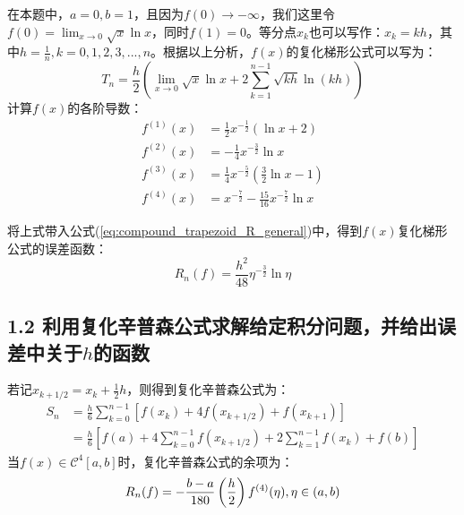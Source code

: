 在本题中，$a=0,b=1$，且因为$f(0) \rightarrow -\infty$，我们这里令$f(0) = \lim_{x \rightarrow 0} \sqrt{x} \ln x$，同时$f(1) = 0$。等分点$x_k$也可以写作：$x_k = kh$，其中$h = \frac{1}{n},k=0,1,2,3,...,n$。根据以上分析，$f(x)$的复化梯形公式可以写为：
\begin{equation}
    T_n = \frac{h}{2} \left(\lim_{x\rightarrow 0} \sqrt{x} \ln x + 2 \sum_{k=1}^{n-1} \sqrt{kh} \ln(kh)\right)
    \label{eq:compound_trapezoid_f}
\end{equation}
计算$f(x)$的各阶导数：
\begin{equation}
    \begin{aligned}
        f^{(1)}(x) & = \frac{1}{2} x^{-\frac{1}{2}} (\ln x + 2) \\
        f^{(2)}(x) & = -\frac{1}{4} x^{-\frac{3}{2}} \ln x \\
        f^{(3)}(x) & = \frac{1}{4} x^{-\frac{5}{2}} (\frac{3}{2} \ln x -1) \\
        f^{(4)}(x) & = x^{-\frac{7}{2}} - \frac{15}{16} x^{-\frac{7}{2}} \ln x
    \end{aligned}
    \label{eq:f_diff}
\end{equation}

将上式带入公式(\ref{eq:compound_trapezoid_R_general})中，得到$f(x)$复化梯形公式的误差函数：
\begin{equation}
    R_n(f) = \frac{h^2}{48} \eta^{-\frac{3}{2}} \ln \eta
    \label{eq:compound_trapezoid_R_f}
\end{equation}

\subsection*{1.2 利用复化辛普森公式求解给定积分问题，并给出误差中关于$h$的函数}

若记$x_{k+1/2} = x_k + \frac{1}{2}h$，则得到复化辛普森公式为：
\begin{equation}
    \begin{aligned}
        S_n & = \frac{h}{6} \sum_{k=0}^{n-1} [f(x_k) + 4f(x_{k+1/2}) + f(x_{k+1})] \\
            & = \frac{h}{6} [f(a) + 4\sum_{k=0}^{n-1} f(x_{k+1/2}) + 2\sum_{k=1}^{n-1} f(x_{k}) + f(b)]
    \end{aligned}
    \label{eq:Simpson_general}
\end{equation}
当$f(x) \in \mathcal{C}^4[a,b]$时，复化辛普森公式的余项为：
\begin{equation}
    R_n(f) = - \frac{b-a}{180} \left(\frac{h}{2}\right) f^{(4)}(\eta), \\ \eta \in (a,b)
    \label{eq:simpson_diff}
\end{equation}

